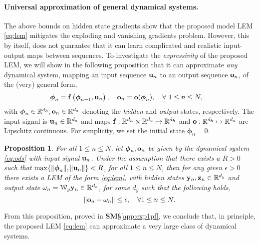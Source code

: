 \documentclass{article} \usepackage{iclr2022_conference,times}
\newcommand{\by}{{\bf y}}
\newcommand{\bz}{{\bf z}}
\newcommand{\bu}{{\bf u}}
\newcommand{\bh}{{\boldsymbol{\phi}}}
\newcommand{\bo}{{\bf o}}
\newcommand{\R}{{\mathbb R}}
\newcommand{\bif}{{\bf f}}
\newcommand{\cW}{\EuScript{W}}
\newcommand{\bom}{{\bf \omega}}
\newtheorem{proposition}[theorem]{Proposition}
\begin{document}
\paragraph{Universal approximation of general dynamical systems.} 
The above bounds on hidden state gradients show that the proposed model LEM \eqref{eq:lem} mitigates the exploding and vanishing gradients problem. However, this by itself, does not guarantee that it can learn complicated and realistic input-output maps between sequences. To investigate the \emph{expressivity} of the proposed LEM, we will show in the following proposition that it can approximate \emph{any} dynamical system, mapping an input sequence $\bu_n$ to an output sequence $\bo_n$, of the (very) general form,
\begin{equation}
    \label{eq:ods}
    \begin{aligned}
    \bh_{n} &= \bif\left(\bh_{n-1},\bu_n\right), \quad
\bo_n = \bo(\bh_n), \quad \forall~1 \leq n \leq N,
    \end{aligned}
\end{equation}
 with $\bh_n \in \R^{d_h},\bo_n \in \R^{d_o}$ denoting the \emph{hidden} and \emph{output} states, respectively. The input signal is $\bu_n \in \R^{d_u}$ and maps $\bif:\R^{d_h}\times \R^{d_u} \mapsto \R^{d_h}$ and $\bo:\R^{d_h} \mapsto \R^{d_o}$ are Lipschitz continuous. For simplicity, we set the initial state $\bh_0 = 0$.
 \begin{proposition}
\label{prop:exp1}
For all $1\leq n \leq N$, let $\bh_n,\bo_n$ be given by the dynamical system \eqref{eq:ods} with input signal $\bu_n$. Under the assumption that there exists a $R > 0$ such that $\max\{\|\bh_n\|,\|\bu_n\|\} < R$, for all $1 \leq n \leq N$, then for any given $\epsilon > 0$ there exists a LEM of the form \eqref{eq:lem}, with hidden states $\by_n,\bz_n \in \R^{d_y}$ and output state $\bom_n = \cW_y \by_n\in \R^{d_o}$, for some $d_y$ such that 
the following holds,
\begin{equation}
    \label{eq:exp1}
    \|\bo_n - \bom_n\| \leq \epsilon, \quad \forall 1 \leq n \leq N.
\end{equation}
\end{proposition}
From this proposition, proved in {\bf SM}\S\ref{app:exp1pf}, we conclude that, in principle, the proposed LEM \eqref{eq:lem} can approximate a very large class of dynamical systems. 
\end{document}
